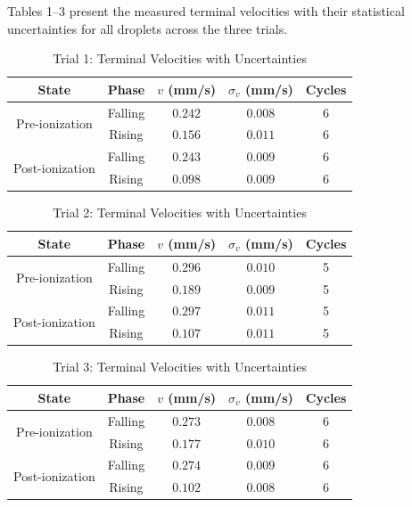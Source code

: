 \documentclass[11pt]{article}
\begin{document}
Tables 1--3 present the measured terminal velocities with their statistical uncertainties for all droplets across the three trials.

\begin{table}[h!]
    \centering
    \caption{Trial 1: Terminal Velocities with Uncertainties}
    \vspace{0.1in}
    \begin{tabular}{|c|c|c|c|c|}
    \hline
    \textbf{State} & \textbf{Phase} & \textbf{$v$ (mm/s)} & $\sigma_v$ (mm/s) & \textbf{Cycles} \\
    \hline
    \multirow{2}{*}{Pre-ionization} & Falling & $0.242$ & $0.008$ & 6 \\
    & Rising & $0.156$ & $0.011$ & 6 \\
    \hline
    \multirow{2}{*}{Post-ionization} & Falling & $0.243$ & $0.009$ & 6 \\
    & Rising & $0.098$ & $0.009$ & 6 \\
    \hline
    \end{tabular}
\end{table}

\begin{table}[h!]
    \centering
    \caption{Trial 2: Terminal Velocities with Uncertainties}
    \vspace{0.1in}
    \begin{tabular}{|c|c|c|c|c|}
    \hline
    \textbf{State} & \textbf{Phase} & \textbf{$v$ (mm/s)} & $\sigma_v$ (mm/s) & \textbf{Cycles} \\
    \hline
    \multirow{2}{*}{Pre-ionization} & Falling & $0.296$ & $0.010$ & 5 \\
    & Rising & $0.189$ & $0.009$ & 5 \\
    \hline
    \multirow{2}{*}{Post-ionization} & Falling & $0.297$ & $0.011$ & 5 \\
    & Rising & $0.107$ & $0.011$ & 5 \\
    \hline
    \end{tabular}
\end{table}

\begin{table}[h!]
    \centering
    \caption{Trial 3: Terminal Velocities with Uncertainties}
    \vspace{0.1in}
    \begin{tabular}{|c|c|c|c|c|}
    \hline
    \textbf{State} & \textbf{Phase} & \textbf{$v$ (mm/s)} & $\sigma_v$ (mm/s) & \textbf{Cycles} \\
    \hline
    \multirow{2}{*}{Pre-ionization} & Falling & $0.273$ & $0.008$ & 6 \\
    & Rising & $0.177$ & $0.010$ & 6 \\
    \hline
    \multirow{2}{*}{Post-ionization} & Falling & $0.274$ & $0.009$ & 6 \\
    & Rising & $0.102$ & $0.008$ & 6 \\
    \hline
    \end{tabular}
\end{table}
\end{document}
